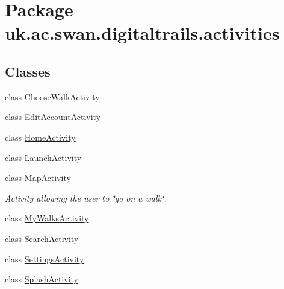\hypertarget{namespaceuk_1_1ac_1_1swan_1_1digitaltrails_1_1activities}{\section{Package uk.\+ac.\+swan.\+digitaltrails.\+activities}
\label{namespaceuk_1_1ac_1_1swan_1_1digitaltrails_1_1activities}
}
\subsection*{Classes}
\begin{DoxyCompactItemize}
\item 
class \hyperlink{classuk_1_1ac_1_1swan_1_1digitaltrails_1_1activities_1_1_choose_walk_activity}{Choose\+Walk\+Activity}
\item 
class \hyperlink{classuk_1_1ac_1_1swan_1_1digitaltrails_1_1activities_1_1_edit_account_activity}{Edit\+Account\+Activity}
\item 
class \hyperlink{classuk_1_1ac_1_1swan_1_1digitaltrails_1_1activities_1_1_home_activity}{Home\+Activity}
\item 
class \hyperlink{classuk_1_1ac_1_1swan_1_1digitaltrails_1_1activities_1_1_launch_activity}{Launch\+Activity}
\item 
class \hyperlink{classuk_1_1ac_1_1swan_1_1digitaltrails_1_1activities_1_1_map_activity}{Map\+Activity}
\begin{DoxyCompactList}\small\item\em Activity allowing the user to \char`\"{}go on a walk\char`\"{}. \end{DoxyCompactList}\item 
class \hyperlink{classuk_1_1ac_1_1swan_1_1digitaltrails_1_1activities_1_1_my_walks_activity}{My\+Walks\+Activity}
\item 
class \hyperlink{classuk_1_1ac_1_1swan_1_1digitaltrails_1_1activities_1_1_search_activity}{Search\+Activity}
\item 
class \hyperlink{classuk_1_1ac_1_1swan_1_1digitaltrails_1_1activities_1_1_settings_activity}{Settings\+Activity}
\item 
class \hyperlink{classuk_1_1ac_1_1swan_1_1digitaltrails_1_1activities_1_1_splash_activity}{Splash\+Activity}
\end{DoxyCompactItemize}
